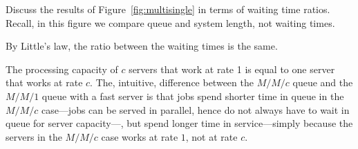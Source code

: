 \begin{question}
  Discuss the results of Figure~\ref{fig:multisingle} in terms of
  waiting time ratios. Recall, in this figure we compare queue and
  system length, not waiting times.

  \begin{solution}
    By Little's law, the ratio between the waiting times is the same.

The processing capacity of $c$ servers that work at rate 1 is equal to
one server that works at rate $c$. The, intuitive, difference between
the $M/M/c$ queue and the $M/M/1$ queue with a fast server is that
jobs spend shorter time in queue in the $M/M/c$ case---jobs can be
served in parallel, hence do not always have to wait in queue for
server capacity---, but spend longer time in service---simply because
the servers in the $M/M/c$ case works at rate $1$, not at rate $c$.

\end{solution}
\end{question}



